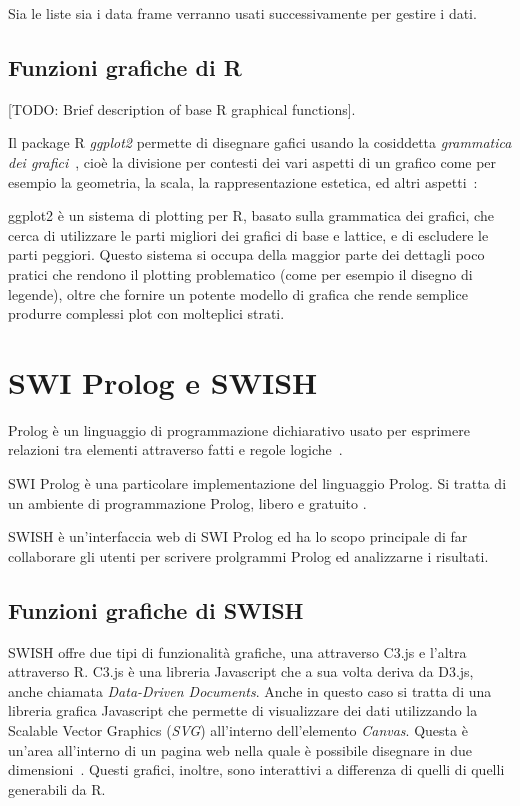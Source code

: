 \documentclass[10pt,titlepage,twoside,a4paper]{report}
\begin{document}
Sia le liste sia i data frame verranno usati successivamente per gestire i 
dati.

    \subsection{Funzioni grafiche di R}
[TODO: Brief description of base R graphical functions].

Il package R \emph{ggplot2} 
permette di disegnare gafici usando la 
cosiddetta \emph{grammatica dei grafici}~\cite{grammarOfGraphics}, cioè la 
divisione per contesti dei vari aspetti di un grafico come per esempio la 
geometria, la scala, la rappresentazione estetica, ed altri 
aspetti~\cite{ggplot2OriginalDefinition}:

\begin{displayquote}
ggplot2 è un sistema di plotting per R, basato sulla grammatica dei grafici,
che cerca di utilizzare le parti migliori dei grafici di base e lattice, e di 
escludere le parti peggiori. Questo sistema si occupa della maggior parte dei
dettagli poco pratici che rendono il plotting problematico (come per esempio 
il disegno di legende), oltre che fornire un potente modello di grafica che
rende semplice produrre complessi plot con molteplici strati.
\end{displayquote}




\section{SWI Prolog e SWISH}
Prolog è un linguaggio di programmazione dichiarativo usato per 
esprimere relazioni tra elementi attraverso fatti e regole 
logiche~\cite{prolog}.

SWI Prolog è una particolare implementazione del linguaggio Prolog. Si tratta 
di un ambiente di programmazione Prolog, libero e gratuito 
\cite{swiprolog}.

SWISH è un'interfaccia web di SWI Prolog \cite{swish}
ed ha lo scopo principale di far collaborare gli utenti per scrivere 
prolgrammi Prolog ed analizzarne i risultati.

        \subsection{Funzioni grafiche di SWISH}
SWISH offre due tipi di funzionalità grafiche, una attraverso C3.js e l'altra
attraverso R. C3.js è una libreria Javascript che a sua volta deriva da
D3.js, anche chiamata \emph{Data-Driven Documents}. Anche in questo caso si 
tratta di una libreria grafica Javascript che permette di visualizzare
dei dati utilizzando la Scalable Vector Graphics (\emph{SVG}) all'interno 
dell'elemento \emph{Canvas}. Questa è un'area all'interno di un pagina web 
nella quale è possibile disegnare in due 
dimensioni\cite{canvasHtml}~\cite{d3js}. Questi grafici, inoltre, sono 
interattivi a differenza di quelli di quelli generabili da R.
\end{document}
